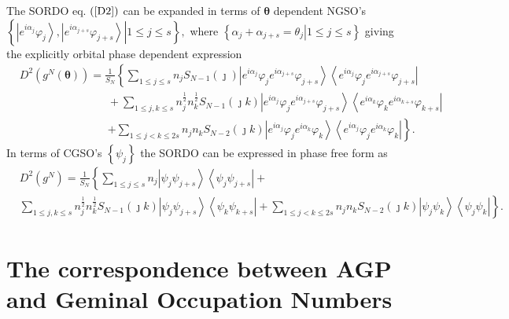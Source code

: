 \documentclass[aps,preprint]{revtex4}%
\begin{document}
The SORDO eq. $\left(  \ref{D2}\right)  $ can be expanded in terms of
$\mathbf{\theta}$ dependent NGSO's $\left\{  \left.  \left\vert e^{i\alpha
_{j}}\varphi_{j}\right\rangle ,\left\vert e^{i\alpha_{j+s}}\varphi
_{j+s}\right\rangle \right\vert 1\leq j\leq s\right\}  ,$ where $\left\{
\left.  \alpha_{j}+\alpha_{j+s}=\theta_{j}\right\vert 1\leq j\leq s\right\}  $
giving the explicitly orbital phase dependent expression
\begin{align}
&  D^{2}\left(  g^{N}\left(  \mathbf{\theta}\right)  \right)  =\frac{1}{S_{N}%
}\left\{  \sum_{1\leq j\leq s}n_{j}S_{N-1}\left(  \jmath\right)  \left\vert
e^{i\alpha_{j}}\varphi_{j}e^{i\alpha_{j+s}}\varphi_{j+s}\right\rangle
\left\langle e^{i\alpha_{j}}\varphi_{j}e^{i\alpha_{j+s}}\varphi_{j+s}%
\right\vert \right. \nonumber\\
&  \qquad\qquad\qquad\qquad+\sum_{1\leq j,k\leq s}n_{j}^{\frac{1}{2}}%
n_{k}^{\frac{1}{2}}S_{N-1}\left(  \jmath k\right)  \left\vert e^{i\alpha_{j}%
}\varphi_{j}e^{i\alpha_{j+s}}\varphi_{j+s}\right\rangle \left\langle
e^{i\alpha_{k}}\varphi_{k}e^{i\alpha_{k+s}}\varphi_{k+s}\right\vert
\nonumber\\
&  \qquad\qquad\qquad\qquad\left.  +\sum_{1\leq j<k\leq2s}n_{j}n_{k}%
S_{N-2}\left(  \jmath k\right)  \left\vert e^{i\alpha_{j}}\varphi
_{j}e^{i\alpha_{k}}\varphi_{k}\right\rangle \left\langle e^{i\alpha_{j}%
}\varphi_{j}e^{i\alpha_{k}}\varphi_{k}\right\vert \right\}  . \label{en2}%
\end{align}
In terms of CGSO's $\left\{  \psi_{j}\right\}  $ the SORDO can be expressed in
phase free form as
\begin{align}
&  D^{2}\left(  g^{N}\right)  =\frac{1}{S_{N}}\left\{  \sum_{1\leq j\leq
s}n_{j}\left\vert \psi_{j}\psi_{j+s}\right\rangle \left\langle \psi_{j}%
\psi_{j+s}\right\vert \right.  +\nonumber\\
&  \left.  \sum_{1\leq j,k\leq s}n_{j}^{\frac{1}{2}}n_{k}^{\frac{1}{2}}%
S_{N-1}\left(  \jmath k\right)  \left\vert \psi_{j}\psi_{j+s}\right\rangle
\left\langle \psi_{k}\psi_{k+s}\right\vert +\sum_{1\leq j<k\leq2s}n_{j}%
n_{k}S_{N-2}\left(  \jmath k\right)  \left\vert \psi_{j}\psi_{k}\right\rangle
\left\langle \psi_{j}\psi_{k}\right\vert \right\}  . \label{D2C}%
\end{align}


\section{The correspondence between AGP and Geminal Occupation
Numbers\label{transform}}
\end{document}
